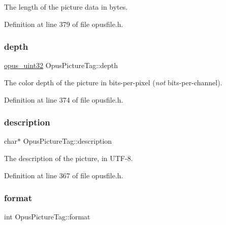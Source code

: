 The length of the picture data in bytes. 

Definition at line 379 of file opusfile.\+h.

\mbox{\label{struct_opus_picture_tag_a9af23c314edf9a995c95a4d28f49eac0}} 
\subsubsection{\texorpdfstring{depth}{depth}}
{\footnotesize\ttfamily \mbox{\hyperlink{opus__types_8h_a643eaaadb9ef6cd44308e0299d8cd8ce}{opus\+\_\+uint32}} Opus\+Picture\+Tag\+::depth}

The color depth of the picture in bits-\/per-\/pixel ({\itshape not} bits-\/per-\/channel). 

Definition at line 374 of file opusfile.\+h.

\mbox{\label{struct_opus_picture_tag_aa32d8bfcd831aa218b0de6d6af92dc08}} 
\subsubsection{\texorpdfstring{description}{description}}
{\footnotesize\ttfamily char$\ast$ Opus\+Picture\+Tag\+::description}

The description of the picture, in U\+T\+F-\/8. 

Definition at line 367 of file opusfile.\+h.

\mbox{\label{struct_opus_picture_tag_aba2d71a09ecf0999cf5faf7c2276fb37}} 
\subsubsection{\texorpdfstring{format}{format}}
{\footnotesize\ttfamily int Opus\+Picture\+Tag\+::format}

